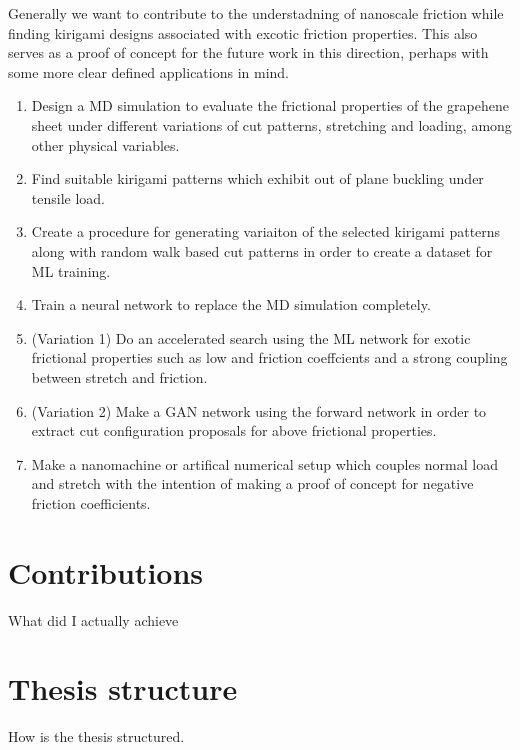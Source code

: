 Generally we want to contribute to the understadning of nanoscale friction while finding kirigami designs associated with excotic friction properties. This also serves as a proof of concept for the future work in this direction, perhaps with some more clear defined applications in mind. 

\begin{enumerate}
    \item Design a MD simulation to evaluate the frictional properties of the
    grapehene sheet under different variations of cut patterns, stretching and
    loading, among other physical variables.
    \item Find suitable kirigami patterns which exhibit out of plane buckling under tensile load.
    \item Create a procedure for generating variaiton of the selected kirigami patterns along with random walk based cut patterns in order to create a dataset for ML training. 
    \item Train a neural network to replace the MD simulation completely.
    \item (Variation 1) Do an accelerated search using the ML network for exotic
    frictional properties such as low and friction coeffcients and a strong
    coupling between stretch and friction. 
    \item (Variation 2) Make a GAN network using the forward network in order to extract cut configuration proposals for above frictional properties.
    \item Make a nanomachine or artifical numerical setup which couples normal load and stretch with the intention of making a proof of concept for negative friction coefficients. 
\end{enumerate}


\section{Contributions}

What did I actually achieve

\section{Thesis structure}

How is the thesis structured.





